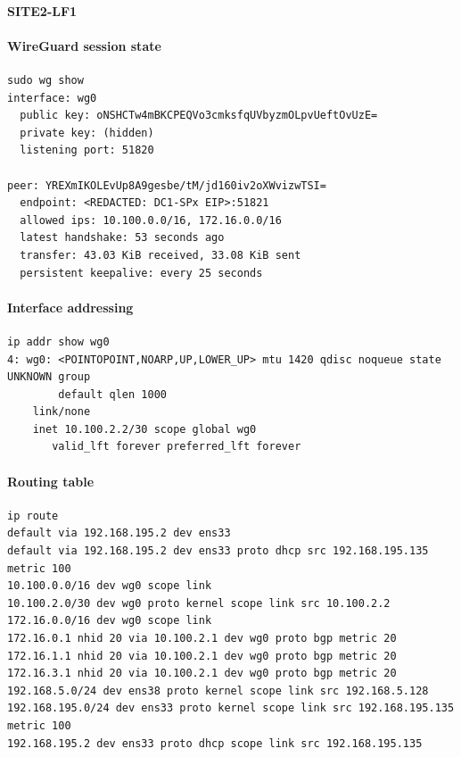 \documentclass[11pt]{article}
\begin{document}
\paragraph{SITE2-LF1}

\paragraph{WireGuard session state}

\begin{verbatim}
sudo wg show
interface: wg0
  public key: oNSHCTw4mBKCPEQVo3cmksfqUVbyzmOLpvUeftOvUzE=
  private key: (hidden)
  listening port: 51820

peer: YREXmIKOLEvUp8A9gesbe/tM/jd160iv2oXWvizwTSI=
  endpoint: <REDACTED: DC1-SPx EIP>:51821
  allowed ips: 10.100.0.0/16, 172.16.0.0/16
  latest handshake: 53 seconds ago
  transfer: 43.03 KiB received, 33.08 KiB sent
  persistent keepalive: every 25 seconds
\end{verbatim}

\paragraph{Interface addressing}

\begin{verbatim}
ip addr show wg0
4: wg0: <POINTOPOINT,NOARP,UP,LOWER_UP> mtu 1420 qdisc noqueue state UNKNOWN group
        default qlen 1000
    link/none
    inet 10.100.2.2/30 scope global wg0
       valid_lft forever preferred_lft forever
\end{verbatim}

\paragraph{Routing table}

\begin{verbatim}
ip route
default via 192.168.195.2 dev ens33
default via 192.168.195.2 dev ens33 proto dhcp src 192.168.195.135 metric 100
10.100.0.0/16 dev wg0 scope link
10.100.2.0/30 dev wg0 proto kernel scope link src 10.100.2.2
172.16.0.0/16 dev wg0 scope link
172.16.0.1 nhid 20 via 10.100.2.1 dev wg0 proto bgp metric 20
172.16.1.1 nhid 20 via 10.100.2.1 dev wg0 proto bgp metric 20
172.16.3.1 nhid 20 via 10.100.2.1 dev wg0 proto bgp metric 20
192.168.5.0/24 dev ens38 proto kernel scope link src 192.168.5.128
192.168.195.0/24 dev ens33 proto kernel scope link src 192.168.195.135 metric 100
192.168.195.2 dev ens33 proto dhcp scope link src 192.168.195.135
\end{verbatim}
\end{document}
